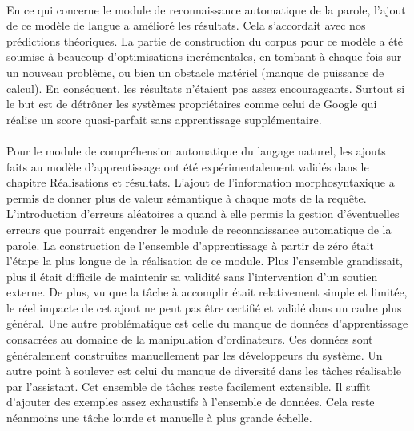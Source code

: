 \paragraph{}
En ce qui concerne le module de reconnaissance automatique de la parole, l'ajout de ce modèle de langue a amélioré les résultats. Cela s'accordait avec nos prédictions théoriques. La partie de construction du corpus pour ce modèle a été soumise à beaucoup d'optimisations incrémentales, en tombant à chaque fois sur un nouveau problème, ou bien un obstacle matériel (manque de puissance de calcul). En conséquent, les résultats n'étaient pas assez encourageants. Surtout si le but est de détrôner les systèmes propriétaires comme celui de Google qui réalise un score quasi-parfait sans apprentissage supplémentaire.

\paragraph{}


Pour le module de compréhension automatique du langage naturel, les ajouts faits au modèle d'apprentissage ont été expérimentalement validés dans le chapitre Réalisations et résultats. L'ajout de l'information morphosyntaxique a permis de donner plus de valeur sémantique à chaque mots de la requête. L'introduction d'erreurs aléatoires a quand à elle permis la gestion d'éventuelles erreurs que pourrait engendrer le module de reconnaissance automatique de la parole. La construction de l'ensemble d'apprentissage à partir de zéro était l'étape la plus longue de la réalisation de ce module. Plus l'ensemble grandissait, plus il était difficile de maintenir sa validité sans l'intervention d'un soutien externe. De plus, vu que la tâche à accomplir était relativement simple et limitée, le réel impacte de cet ajout ne peut pas être certifié et validé dans un cadre plus général. Une autre problématique est celle du manque de données d'apprentissage consacrées au domaine de la manipulation d'ordinateurs. Ces données sont généralement construites manuellement par les développeurs du système. Un autre point à soulever est celui du manque de diversité dans les tâches réalisable par l'assistant. Cet ensemble de tâches reste facilement extensible. Il suffit d'ajouter des exemples assez exhaustifs à l'ensemble de données. Cela reste néanmoins une tâche lourde et manuelle à plus grande échelle.

